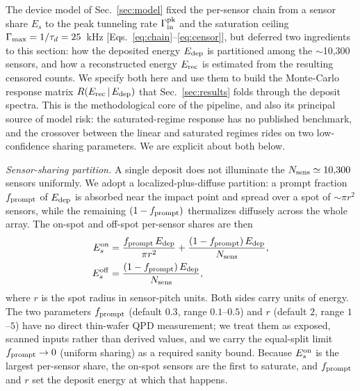 The device model of Sec.~\ref{sec:model} fixed the per-sensor chain from a sensor share $E_s$ to the peak tunneling rate $\Gamma_{\rm in}^{\rm pk}$ and the saturation ceiling $\Gamma_{\rm max}=1/\tau_d=25$~kHz [Eqs.~\eqref{eq:chain}--\eqref{eq:censor}], but deferred two ingredients to this section: how the deposited energy $E_{\rm dep}$ is partitioned among the $\sim$10,300 sensors, and how a reconstructed energy $E_{\rm rec}$ is estimated from the resulting censored counts. We specify both here and use them to build the Monte-Carlo response matrix $R(E_{\rm rec}\,|\,E_{\rm dep})$ that Sec.~\ref{sec:results} folds through the deposit spectra. This is the methodological core of the pipeline, and also its principal source of model risk: the saturated-regime response has no published benchmark, and the crossover between the linear and saturated regimes rides on two low-confidence sharing parameters. We are explicit about both below.

\emph{Sensor-sharing partition.} A single deposit does not illuminate the $N_{\rm sens}\simeq10{,}300$ sensors uniformly. We adopt a localized-plus-diffuse partition: a prompt fraction $f_{\rm prompt}$ of $E_{\rm dep}$ is absorbed near the impact point and spread over a spot of $\sim$$\pi r^2$ sensors, while the remaining $(1-f_{\rm prompt})$ thermalizes diffusely across the whole array. The on-spot and off-spot per-sensor shares are then
\begin{align}
E_s^{\rm on}  &= \frac{f_{\rm prompt}\,E_{\rm dep}}{\pi r^2} + \frac{(1-f_{\rm prompt})\,E_{\rm dep}}{N_{\rm sens}}, \nonumber\\
E_s^{\rm off} &= \frac{(1-f_{\rm prompt})\,E_{\rm dep}}{N_{\rm sens}},
\label{eq:sharing}
\end{align}
where $r$ is the spot radius in sensor-pitch units. Both sides carry units of energy. The two parameters $f_{\rm prompt}$ (default $0.3$, range $0.1$--$0.5$) and $r$ (default $2$, range $1$--$5$) have no direct thin-wafer QPD measurement; we treat them as exposed, scanned inputs rather than derived values, and we carry the equal-split limit $f_{\rm prompt}\to0$ (uniform sharing) as a required sanity bound. Because $E_s^{\rm on}$ is the largest per-sensor share, the on-spot sensors are the first to saturate, and $f_{\rm prompt}$ and $r$ set the deposit energy at which that happens.

